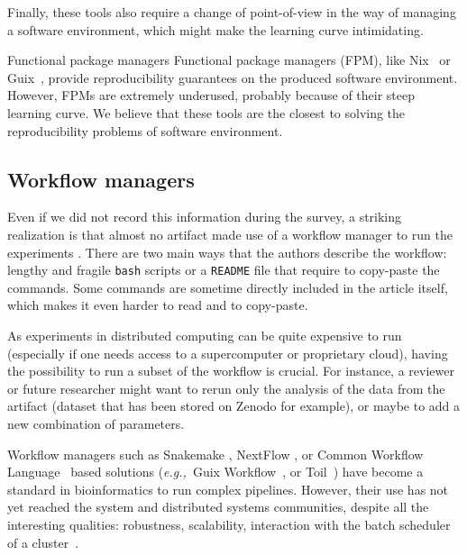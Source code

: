 \documentclass[sigconf,natbib=false]{acmart}
\newcommand{\eg}{\emph{e.g.,}}
\begin{document}
Finally, these tools also require a change of point-of-view in the way of managing a software environment, which might make the learning curve intimidating.

\begin{lesson}{Functional package managers}{}
  Functional package managers (FPM), like Nix\ \cite{dolstra_nix_2004} or Guix\ \cite{courtes_functional_2013}, provide reproducibility guarantees on the produced software environment.
  However, FPMs are extremely underused, probably because of their steep learning curve.
  We believe that these tools are the closest to solving the reproducibility problems of software environment.
\end{lesson}

\subsection{Workflow managers}\label{sec:sop:workflow}

Even if we did not record this information during the survey, a striking realization is that almost no artifact made use of a workflow manager to run the experiments .
There are two main ways that the authors describe the workflow: lengthy and fragile \texttt{bash} scripts or a \texttt{README} file that require to copy-paste the commands.
Some commands are sometime directly included in the article itself, which makes it even harder to read and to copy-paste.

As experiments in distributed computing can be quite expensive to run (especially if one needs access to a supercomputer or proprietary cloud), having the possibility to run a subset of the workflow is crucial.
For instance, a reviewer or future researcher might want to rerun only the analysis of the data from the artifact (dataset that has been stored on Zenodo for example), or maybe to add a new combination of parameters. 

Workflow managers \cite{wratten2021reproducible} such as Snakemake \cite{koster2012snakemake}, NextFlow \cite{di2017nextflow}, or Common Workflow Language\ \cite{amstutz2016common} based solutions (\eg\ Guix Workflow\ \cite{strozzi2019scalable}, or Toil\ \cite{vivian2017toil}) have become a standard in bioinformatics to run complex pipelines.
However, their use has not yet reached the system and distributed systems communities, despite all the interesting qualities: robustness, scalability, interaction with the batch scheduler of a cluster\ \cite{snakemake-executor-plugin-slurm}.
\end{document}
